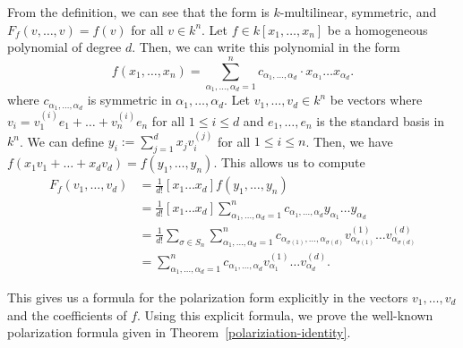 \documentclass{puthesis-UG}
\begin{document}
From the definition, we can see that the form is $k$-multilinear, symmetric, and $F_f(v, \ldots, v) = f(v)$ for all $v \in k^n$. Let $f \in k[x_1, \ldots, x_n]$ be a homogeneous polynomial of degree $d$. Then, we can write this polynomial in the form 
\[
	f(x_1, \ldots, x_n) = \sum_{\alpha_1, \ldots, \alpha_d = 1}^n c_{\alpha_1, \ldots, \alpha_d} \cdot x_{\alpha_1} \ldots x_{\alpha_d}.
\]
where $c_{\alpha_1, \ldots, \alpha_d}$ is symmetric in $\alpha_1, \ldots, \alpha_d$. Let $v_1, \ldots, v_d\in k^n$ be vectors where $v_i = v_1^{(i)} e_1 + \ldots + v_n^{(i)} e_n$ for all $1 \leq i \leq d$ and $e_1, \ldots, e_n$ is the standard basis in $k^n$. We can define $y_i := \sum_{j = 1}^d x_j v_i^{(j)}$ for all $1 \leq i \leq n$. Then, we have $f(x_1 v_1 + \ldots + x_d v_d) = f(y_1, \ldots, y_n)$. This allows us to compute
\begin{align*}
	F_f(v_1, \ldots, v_d) & = \frac{1}{d!}[x_1 \ldots x_d] f(y_1, \ldots, y_n) \\
	& = \frac{1}{d!} [x_1 \ldots x_d] \sum_{\alpha_1, \ldots, \alpha_d = 1}^n c_{\alpha_1, \ldots, \alpha_d} y_{\alpha_1} \ldots y_{\alpha_d} \\
	& = \frac{1}{d!} \sum_{\sigma \in S_n} \sum_{\alpha_1, \ldots, \alpha_d = 1}^n c_{\alpha_{\sigma(1)}, \ldots, \alpha_{\sigma(d)}} v_{\alpha_{\sigma(1)}}^{(1)} \ldots v_{\alpha_{\sigma(d)}}^{(d)} \\
	& = \sum_{\alpha_1, \ldots, \alpha_d = 1}^n c_{\alpha_1, \ldots, \alpha_d} v_{\alpha_1}^{(1)} \ldots v_{\alpha_d}^{(d)}.
\end{align*}

This gives us a formula for the polarization form explicitly in the vectors $v_1, \ldots, v_d$ and the coefficients of $f$. Using this explicit formula, we prove the well-known polarization formula given in Theorem~\ref{polariziation-identity}.
\end{document}
